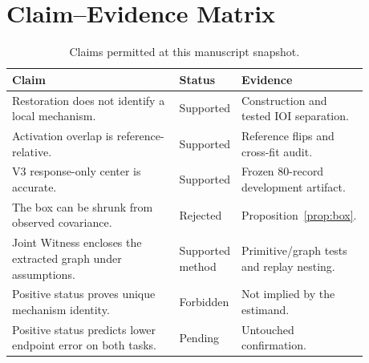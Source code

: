 \documentclass{article}
\begin{document}
\section{Claim--Evidence Matrix}
\label{app:claims}
\begin{table}[h]
\caption{Claims permitted at this manuscript snapshot.}
\centering\small
\begin{tabular}{p{0.48\linewidth}p{0.16\linewidth}p{0.24\linewidth}}
\toprule
\textbf{Claim} & \textbf{Status} & \textbf{Evidence} \\
\midrule
Restoration does not identify a local mechanism. & Supported & Construction and tested IOI separation. \\
Activation overlap is reference-relative. & Supported & Reference flips and cross-fit audit. \\
V3 response-only center is accurate. & Supported & Frozen 80-record development artifact. \\
The box can be shrunk from observed covariance. & Rejected & Proposition~\ref{prop:box}. \\
Joint Witness encloses the extracted graph under assumptions. & Supported method & Primitive/graph tests and replay nesting. \\
Positive status proves unique mechanism identity. & Forbidden & Not implied by the estimand. \\
Positive status predicts lower endpoint error on both tasks. & Pending & Untouched confirmation. \\
\bottomrule
\end{tabular}
\end{table}
\end{document}
